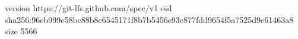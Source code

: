 version https://git-lfs.github.com/spec/v1
oid sha256:96eb999c58bc88b8c6545171f8b7b5456e93c877fdd9654f5a7525d9e61463a8
size 5566
